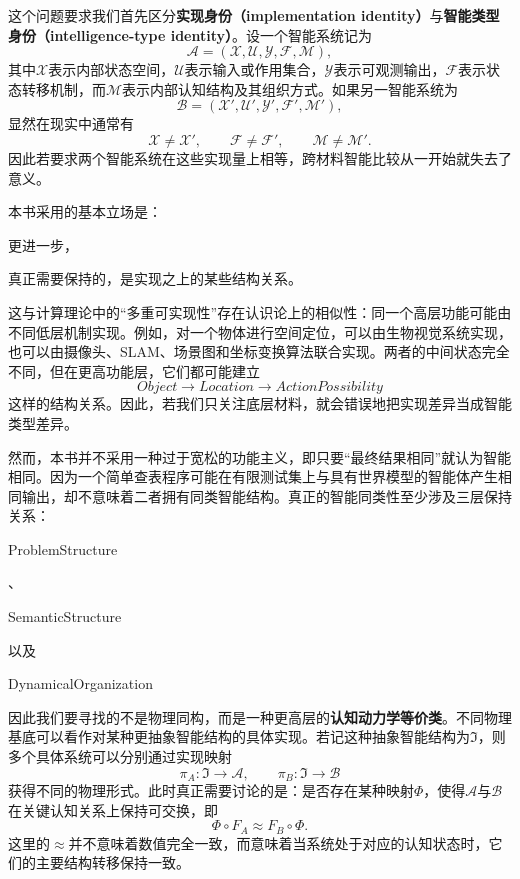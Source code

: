 这个问题要求我们首先区分\textbf{实现身份（implementation identity）}与\textbf{智能类型身份（intelligence-type identity）}。设一个智能系统记为
\[
\mathcal A=
(\mathcal X,\mathcal U,\mathcal Y,\mathcal F,\mathcal M),
\]
其中$\mathcal X$表示内部状态空间，$\mathcal U$表示输入或作用集合，$\mathcal Y$表示可观测输出，$\mathcal F$表示状态转移机制，而$\mathcal M$表示内部认知结构及其组织方式。如果另一智能系统为
\[
\mathcal B=
(\mathcal X',\mathcal U',\mathcal Y',\mathcal F',\mathcal M'),
\]
显然在现实中通常有
\[
\mathcal X\neq\mathcal X',
\qquad
\mathcal F\neq\mathcal F',
\qquad
\mathcal M\neq\mathcal M'.
\]
因此若要求两个智能系统在这些实现量上相等，跨材料智能比较从一开始就失去了意义。

本书采用的基本立场是：
\begin{statementbox}
\centering
{}
\end{statementbox}
更进一步，
\begin{statementbox}
\centering
{}
\end{statementbox}
真正需要保持的，是实现之上的某些结构关系。

这与计算理论中的``多重可实现性''存在认识论上的相似性：同一个高层功能可能由不同低层机制实现。例如，对一个物体进行空间定位，可以由生物视觉系统实现，也可以由摄像头、SLAM、场景图和坐标变换算法联合实现。两者的中间状态完全不同，但在更高功能层，它们都可能建立
\[
Object
\rightarrow
Location
\rightarrow
ActionPossibility
\]
这样的结构关系。因此，若我们只关注底层材料，就会错误地把实现差异当成智能类型差异。

然而，本书并不采用一种过于宽松的功能主义，即只要``最终结果相同''就认为智能相同。因为一个简单查表程序可能在有限测试集上与具有世界模型的智能体产生相同输出，却不意味着二者拥有同类智能结构。真正的智能同类性至少涉及三层保持关系：
\begin{statementbox}
ProblemStructure
\end{statementbox}
、
\begin{statementbox}
SemanticStructure
\end{statementbox}
以及
\begin{statementbox}
DynamicalOrganization
\end{statementbox}

因此我们要寻找的不是物理同构，而是一种更高层的\textbf{认知动力学等价类}。不同物理基底可以看作对某种更抽象智能结构的具体实现。若记这种抽象智能结构为$\mathfrak I$，则多个具体系统可以分别通过实现映射
\[
\pi_A:\mathfrak I\rightarrow\mathcal A,
\qquad
\pi_B:\mathfrak I\rightarrow\mathcal B
\]
获得不同的物理形式。此时真正需要讨论的是：是否存在某种映射$\Phi$，使得$\mathcal A$与$\mathcal B$在关键认知关系上保持可交换，即
\[
\Phi\circ F_A
\approx
F_B\circ\Phi.
\]
这里的$\approx$并不意味着数值完全一致，而意味着当系统处于对应的认知状态时，它们的主要结构转移保持一致。

